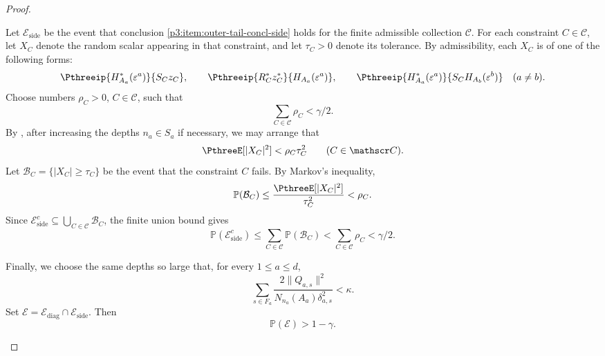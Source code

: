 \documentclass[11pt,reqno]{amsart}
\makeatletter
\theoremstyle{plain}
\theoremstyle{definition}
\newcounter{problempaper}
\newenvironment{problempaperbody}{%
  \setcounter{subsection}{0}%
  \setcounter{subsubsection}{0}%
  \setcounter{paragraph}{0}%
  \renewcommand{\thesubsection}{\arabic{subsection}}%
  \renewcommand{\thesubsubsection}{\thesubsection.\arabic{subsubsection}}%
  \renewcommand{\theparagraph}{\thesubsubsection.\arabic{paragraph}}%
  \let\problem@outersection\section
  \let\problem@outersubsection\subsection
  \let\problem@outersubsubsection\subsubsection
  \let\problem@outerparagraph\paragraph
  \let\section\problem@papersection
  \let\subsection\problem@papersubsection
  \let\subsubsection\problem@papersubsubsection
}{%
  \let\section\problem@outersection
  \let\subsection\problem@outersubsection
  \let\subsubsection\problem@outersubsubsection
  \let\paragraph\problem@outerparagraph
}
\newcommand{\problem@target}[2]{%
  \hypertarget{problem-\theproblempaper-#1-#2}{}%
}
\newcommand{\problem@paperheading}[3]{%
  \par\bigskip
  \problem@target{#1}{#2}%
  \noindent{\large\bfseries #2.\quad #3\par}%
  \nobreak\smallskip
}
\newcommand{\problem@papersubheading}[3]{%
  \par\medskip
  \problem@target{#1}{#2}%
  \noindent{\normalsize\bfseries #2.\quad #3\par}%
  \nobreak\smallskip
}
\newcommand{\problem@papersubsubheading}[3]{%
  \par\smallskip
  \problem@target{#1}{#2}%
  \noindent{\normalsize\itshape #2.\quad #3.\ }%
}
\def\problem@papersection{%
  \@ifstar{\problem@papersectionstar}{\problem@papersectionnostar}%
}
\def\problem@papersectionstar#1{%
  \par\bigskip\noindent{\large\bfseries #1\par}\nobreak\smallskip
}
\def\problem@papersectionnostar#1{%
  \refstepcounter{subsection}%
  \setcounter{subsubsection}{0}%
  \setcounter{paragraph}{0}%
  \problem@paperheading{section}{\thesubsection}{#1}%
  \problem@writecontentsline{section}{\thesubsection}{#1}%
}
\def\problem@papersubsection{%
  \@ifstar{\problem@papersubsectionstar}{\problem@papersubsectionnostar}%
}
\def\problem@papersubsectionstar#1{%
  \par\medskip\noindent{\normalsize\bfseries #1\par}\nobreak\smallskip
}
\def\problem@papersubsectionnostar#1{%
  \refstepcounter{subsubsection}%
  \setcounter{paragraph}{0}%
  \problem@papersubheading{subsection}{\thesubsubsection}{#1}%
  \problem@writecontentsline{subsection}{\thesubsubsection}{#1}%
}
\def\problem@papersubsubsection{%
  \@ifstar{\problem@papersubsubsectionstar}{\problem@papersubsubsectionnostar}%
}
\def\problem@papersubsubsectionstar#1{%
  \par\smallskip\noindent{\normalsize\itshape #1.\ }%
}
\def\problem@papersubsubsectionnostar#1{%
  \refstepcounter{paragraph}%
  \problem@papersubsubheading{subsubsection}{\theparagraph}{#1}%
  \problem@writecontentsline{subsubsection}{\theparagraph}{#1}%
}
\newcommand{\problem@writecontentsline}[3]{%
  \begingroup
  \protected@write\@auxout{}{%
    \string\problemcontentsentry{\theproblempaper}{#1}{#2}{#3}{\thepage}%
  }%
  \endgroup
}
\newcommand{\problemcontentsentry}[5]{%
  \@ifundefined{problemcontents@#1}{%
    \expandafter\gdef\csname problemcontents@#1\endcsname{}%
  }{}%
  \expandafter\g@addto@macro\csname problemcontents@#1\endcsname{%
    \problemcontentsline{#1}{#2}{#3}{#4}{#5}%
  }%
}
\newcommand{\problemcontentslink}[4]{%
  \hyperlink{problem-#1-#2-#3}{#4}%
}
\newcommand{\problemcontentsline}[5]{%
  \ifstrequal{#2}{section}{%
    \par\noindent
    \problemcontentslink{#1}{#2}{#3}{\makebox[2.5em][l]{#3}#4}%
    \nobreak\dotfill
    \problemcontentslink{#1}{#2}{#3}{#5}\par
  }{%
    \ifstrequal{#2}{subsection}{%
      \par\noindent\hspace*{1.5em}%
      \problemcontentslink{#1}{#2}{#3}{\makebox[3.5em][l]{#3}#4}%
      \nobreak\dotfill
      \problemcontentslink{#1}{#2}{#3}{#5}\par
    }{%
      \par\noindent\hspace*{3em}%
      \problemcontentslink{#1}{#2}{#3}{\makebox[4.5em][l]{#3}#4}%
      \nobreak\dotfill
      \problemcontentslink{#1}{#2}{#3}{#5}\par
    }%
  }%
}
\makeatother
\begin{document}
\begin{problempaperbody}
\begin{proof}
\begin{description}
Let $\mathcal E_{\mathrm{side}}$ be the event that conclusion \ref{p3:item:outer-tail-concl-side} holds for the finite admissible collection $\mathscr C$. For each constraint $C\in\mathscr C$, let $X_C$ denote the random scalar appearing in that constraint, and let $\tau_C>0$ denote its tolerance. By admissibility, each $X_C$ is of one of the following forms:
\begin{equation*}
        \Pthreeip{H_{A_a}^*(\varepsilon^a)}{S_Cz_C},\qquad \Pthreeip{R_C^*z_C^*}{H_{A_a}(\varepsilon^a)},\qquad \Pthreeip{H_{A_a}^*(\varepsilon^a)}{S_CH_{A_b}(\varepsilon^b)}\quad(a\neq b).
\end{equation*}
Choose numbers $\rho_C>0$, $C\in\mathscr C$, such that
\begin{equation*}
        \sum_{C\in\mathscr C}\rho_C<\gamma/2.
\end{equation*}
By , after increasing the depths $n_a\in S_a$ if necessary, we may arrange that
\begin{equation*}
        \PthreeE[|X_C|^2]<\rho_C\tau_C^2\qquad(C\in\mathscr C).
\end{equation*}
Let $\mathcal B_C=\{|X_C|\geq\tau_C\}$ be the event that the constraint $C$ fails. By Markov's inequality,
\begin{equation*}
        \mathbb P(\mathcal B_C)\leq \frac{\PthreeE[|X_C|^2]}{\tau_C^2}<\rho_C.
\end{equation*}
Since $\mathcal E_{\mathrm{side}}^c\subseteq\bigcup_{C\in\mathscr C}\mathcal B_C$, the finite union bound gives
\begin{equation*}
        \mathbb P(\mathcal E_{\mathrm{side}}^c)\leq \sum_{C\in\mathscr C}\mathbb P(\mathcal B_C)<\sum_{C\in\mathscr C}\rho_C<\gamma/2.
\end{equation*}

Finally, we choose the same depths so large that, for every $1\leq a\leq d$,
\begin{equation}
\label{p3:eq:outer-tail-child-failure-small}
        \sum_{s\in F_a}\frac{2\|Q_{a,s}\|^2}{N_{n_a}(A_a)\delta_{a,s}^2}<\kappa.
\end{equation}
Set $\mathcal E=\mathcal E_{\mathrm{diag}}\cap\mathcal E_{\mathrm{side}}$. Then
\begin{equation}
\label{p3:eq:event-E-large}
        \mathbb P(\mathcal E)>1-\gamma.
\end{equation}


\end{description}
\end{proof}
\end{problempaperbody}
\end{document}
